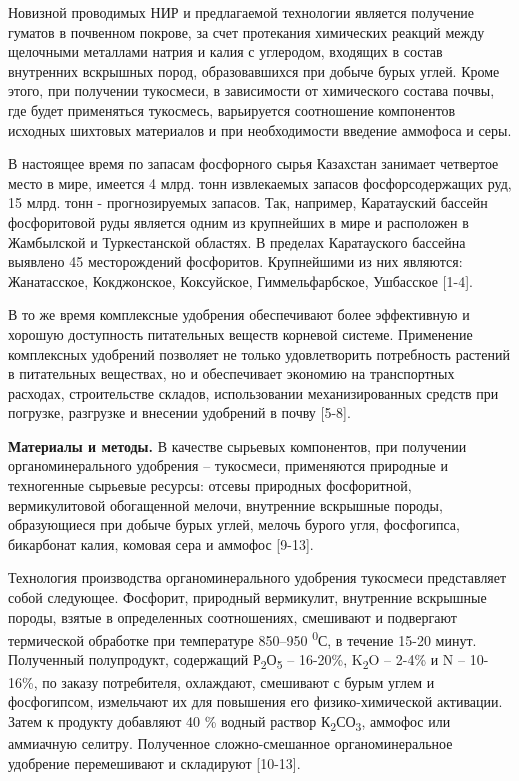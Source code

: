 Новизной проводимых НИР и предлагаемой технологии является получение
гуматов в почвенном покрове, за счет протекания химических реакций между
щелочными металлами натрия и калия с углеродом, входящих в состав
внутренних вскрышных пород, образовавшихся при добыче бурых углей. Кроме
этого, при получении тукосмеси, в зависимости от химического состава
почвы, где будет применяться тукосмесь, варьируется соотношение
компонентов исходных шихтовых материалов и при необходимости введение
аммофоса и серы.

В настоящее время по запасам фосфорного сырья Казахстан занимает
четвертое место в мире, имеется 4 млрд. тонн извлекаемых запасов
фосфорсодержащих руд, 15 млрд. тонн - прогнозируемых запасов. Так,
например, Каратауский бассейн фосфоритовой руды является одним из
крупнейших в мире и расположен в Жамбылской и Туркестанской областях. В
пределах Каратауского бассейна выявлено 45 месторождений фосфоритов.
Крупнейшими из них являются: Жанатасское, Кокджонское, Коксуйское,
Гиммельфарбское, Ушбасское {[}1-4{]}.

В то же время комплексные удобрения обеспечивают более эффективную и
хорошую доступность питательных веществ корневой системе. Применение
комплексных удобрений позволяет не только удовлетворить потребность
растений в питательных веществах, но и обеспечивает экономию на
транспортных расходах, строительстве складов, использовании
механизированных средств при погрузке, разгрузке и внесении удобрений в
почву {[}5-8{]}.

{\bfseries Материалы и методы.} В качестве сырьевых компонентов, при
получении органоминерального удобрения -- тукосмеси, применяются
природные и техногенные сырьевые ресурсы: отсевы природных фосфоритной,
вермикулитовой обогащенной мелочи, внутренние вскрышные породы,
образующиеся при добыче бурых углей, мелочь бурого угля, фосфогипса,
бикарбонат калия, комовая сера и аммофос {[}9-13{]}.

Технология производства органоминерального удобрения тукосмеси
представляет собой следующее. Фосфорит, природный вермикулит, внутренние
вскрышные породы, взятые в определенных соотношениях, смешивают и
подвергают термической обработке при температуре 850--950
\textsuperscript{0}С, в течение 15-20 минут. Полученный полупродукт,
содержащий Р\textsubscript{2}О\textsubscript{5} -- 16-20\%,
K\textsubscript{2}O -- 2-4\% и N -- 10-16\%, по заказу потребителя,
охлаждают, смешивают с бурым углем и фосфогипсом, измельчают их для
повышения его физико-химической активации. Затем к продукту добавляют 40
\% водный раствор К\textsubscript{2}СО\textsubscript{3}, аммофос или
аммиачную селитру. Полученное сложно-смешанное органоминеральное
удобрение перемешивают и складируют {[}10-13{]}.

